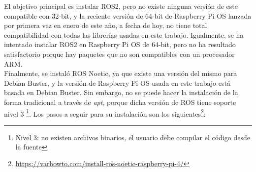 El objetivo principal es instalar ROS2, pero no existe ninguna versión de este compatible con 32-bit, y la reciente versión de 64-bit de Raspberry Pi OS lanzada por primera vez en enero de este año, a fecha de hoy, no tiene total compatibilidad con todas las librerías usadas en este trabajo. Igualmente, se ha intentado instalar ROS2 en Raspberry Pi OS de 64-bit, pero no ha resultado satisfactorio porque hay paquetes que no son compatibles con un procesador ARM.\\

Finalmente, se instaló ROS Noetic, ya que existe una versión del mismo para Debian Buster, y la versión de Raspberry Pi OS usada en este trabajo está basada en Debian Buster. Sin embargo, no se puede hacer la instalación de la forma tradicional a través de \textit{apt}, porque dicha versión de ROS tiene soporte nivel 3 \footnote{Nivel 3: no existen archivos binarios, el usuario debe compilar el código desde la fuente}. Los pasos a seguir para su instalación son los siguientes\footnote{\url{https://varhowto.com/install-ros-noetic-raspberry-pi-4/}}:

